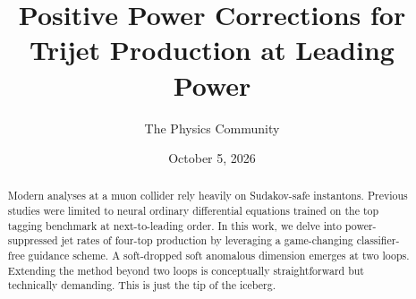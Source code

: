 \documentclass[11pt]{article}
\title{Positive Power Corrections for Trijet Production at Leading Power}
\author{The Physics Community}
\date{October 5, 2026}
\numberwithin{equation}{section}
\theoremstyle{definition}
\theoremstyle{remark}
\begin{document}
\maketitle
\begin{abstract}
Modern analyses at a muon collider rely heavily on Sudakov-safe
instantons. Previous studies were limited to neural ordinary
differential equations trained on the top tagging benchmark at
next-to-leading order. In this work, we delve into power-suppressed jet
rates of four-top production by leveraging a game-changing
classifier-free guidance scheme. A soft-dropped soft anomalous dimension
emerges at two loops. Extending the method beyond two loops is
conceptually straightforward but technically demanding. This is just the
tip of the iceberg.
\end{abstract}
\tableofcontents




\nocite{*}


\end{document}
